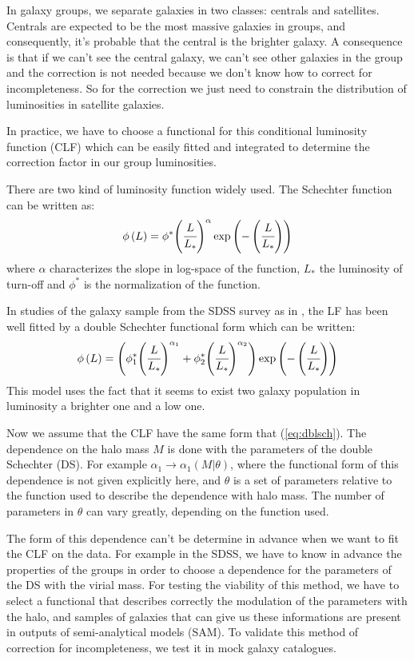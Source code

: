 In galaxy groups, we separate galaxies in two classes: centrals and satellites.
Centrals are expected to be the most massive galaxies in groups, and
consequently, it's probable that the central is the brighter galaxy. A
consequence is that if we can't see the central galaxy, we can't see other
galaxies in the group and the correction is not needed because we don't know
how to correct for incompleteness. So for the correction we just need to
constrain the distribution of luminosities in satellite galaxies.

In practice, we have to choose a functional for this conditional luminosity
function (CLF) which can be easily fitted and integrated to determine the
correction factor in our group luminosities.

There are two kind of luminosity function widely used. The Schechter
function can be written as:
%
\begin{equation}
    \phi\left(L\right)=\phi^*{\left(\cfrac{L}{L_*}\right)}^\alpha
    \exp\left(-\left(\cfrac{L}{L_*}\right)\right)
\end{equation}
%
where $\alpha$ characterizes the slope in log-space of the function, $L_*$
the luminosity of turn-off and $\phi^*$ is the normalization of the
function.

In studies of the galaxy sample from the SDSS survey as in
\citet{Blanton+05}, the LF has been well fitted by a double Schechter
functional form which can be written:
%
\begin{equation}\label{eq:dblsch}
    \phi\left({L}\right)=\left({\phi_1^*{\left({\cfrac{L}{L_*}}\right)}^{\alpha_1}+\phi_2^*{\left({\cfrac{L}{L_*}}\right)}^{\alpha_2}}\right)\exp\left({-\left({\cfrac{L}{L_*}}\right)}\right)%
\end{equation}
%
This model uses the fact that it seems to exist two galaxy population in
luminosity a brighter one and a low one.

Now we assume that the CLF have the same form that (\ref{eq:dblsch}). The
dependence on the halo mass $M$ is done with the parameters of the double
Schechter (DS). For example
$\alpha_1\rightarrow\alpha_1\left({M|\theta}\right)$, where the functional
form of this dependence is not given explicitly here, and $\theta$ is a set
of parameters relative to the function used to describe the dependence with
halo mass. The number of parameters in $\theta$ can vary greatly, depending
on the function used.

The form of this dependence can't be determine in advance when we want to
fit the CLF on the data. For example in the SDSS, we have to know in advance
the properties of the groups in order to choose a dependence for the
parameters of the DS with the virial mass. For testing the viability of this
method, we have to select a functional that describes correctly the
modulation of the parameters with the halo, and samples of galaxies that can
give us these informations are present in outputs of semi-analytical models
(SAM). To validate this method of correction for incompleteness, we test it
in mock galaxy catalogues.
%
